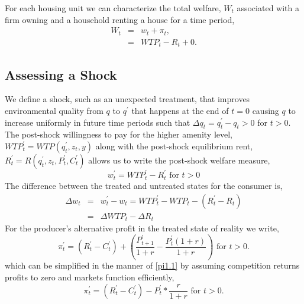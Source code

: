 \documentclass[ecta,nameyear,draft]{econsocart}
\theoremstyle{plain}
\theoremstyle{remark}
\begin{document}
For each housing unit we can characterize the total welfare, $W_t$ associated with a firm owning and a household renting a house for a time period,
\begin{eqnarray*}
	W_t & = & w_t+\pi_t,\\
	& = & \mathit{WTP}_t-R_t+0.
\end{eqnarray*}
\subsection{Assessing a Shock}
We define a shock, such as an unexpected treatment, that improves environmental quality from $q$ to $q^\prime$ that happens at the end of $t=0$ causing $q$ to increase uniformly in future time periods such that $\Delta q_t=q^\prime_t-q_t>0$ for $t>0$.
The post-shock willingness to pay for the higher amenity level,$\mathit{WTP}^\prime_t=\mathit{WTP}(q^\prime_t,z_t,y)$ along with the post-shock equilibrium rent, $R^\prime_t=R(q^\prime_t,z_t,P^\prime_t,C^\prime_t)$ allows us to write the post-shock welfare measure,
\begin{equation*}
	w^\prime_t=\mathit{WTP}^\prime_t-R^\prime_t \text{ for } t>0
\end{equation*}
The difference between the treated and untreated states for the consumer is,
\begin{eqnarray*}
	\Delta w_t&=&w^\prime_t-w_t=\mathit{WTP}^\prime_t-\mathit{WTP}_t-(R^\prime_t-R_t)\\
	&=&\Delta\mathit{WTP}_t-\Delta R_t
\end{eqnarray*}
For the producer’s alternative profit in the treated state of reality we write,
\begin{equation*}
	\pi^\prime_t = (R^\prime_t-C^\prime_t)+\left(\frac{P^\prime_{t+1}}{1+r}-\frac{P^\prime_t(1+r)}{1+r}\right)\text{ for } t>0.
\end{equation*}
which can be simplified in the manner of \ref{pi1.1} by assuming competition returns profits to zero and markets function efficiently,
\begin{equation*}
\pi^\prime_t = (R^\prime_t-C^\prime_t)-P^\prime_t*\frac{r}{1+r}\text{ for } t>0.\label{pi2}
\end{equation*}
\end{document}
